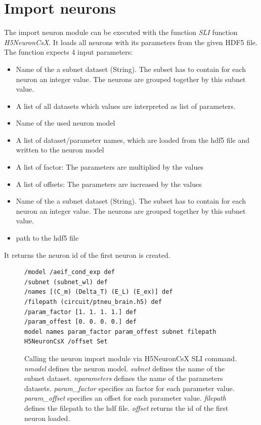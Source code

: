 \section{Import neurons}
The import neuron module can be executed with the function \emph{SLI} function  \emph{H5NeuronCsX}. It loads all neurons with its parameters
from the given HDF5 file. The function expects 4 input parameters:
\begin{itemize}
      \item Name of the a subnet dataset (String).
The subset has to contain for each neuron an integer value.
The neurons are grouped together by this subnet value.
      \item A list of all datasets which values are interpreted as list of parameters.
      
     
      \item Name of the used neuron model
      \item A list of dataset/parameter names, which are loaded from the hdf5 file and written to the neuron model
      \item A list of factor: The parameters are multiplied by the values
      \item A list of offsets: The parameters are increased by the values
      \item Name of the a subnet dataset (String).
The subset has to contain for each neuron an integer value.
The neurons are grouped together by this subnet value.
      \item path to the hdf5 file
\end{itemize}
It returns the neuron id of the first neuron is created.
\begin{figure}[ht!]
\begin{lstlisting}[label=sliNeurons, caption=Example usage of the import neuron module]
/model /aeif_cond_exp def
/subnet (subnet_wl) def
/names [(C_m) (Delta_T) (E_L) (E_ex)] def
/filepath (circuit/ptneu_brain.h5) def
/param_factor [1. 1. 1. 1.] def
/param_offest [0. 0. 0. 0.] def
model names param_factor param_offest subnet filepath H5NeuronCsX /offset Set

\end{lstlisting}
\caption{Calling the neuron import module via H5NeuronCsX SLI command.
\emph{nmodel} defines the neuron model.
\emph{subnet} defines the name of the subnet dataset.
\emph{nparameters} defines the name of the parameters datasets.
\emph{param\_factor} specifies an factor for each parameter value.
\emph{param\_offset} specifies an offset for each parameter value.
\emph{filepath} defines the filepath to the hdf file.
\emph{offset} returns the id of the first neuron loaded.}
\end{figure}

